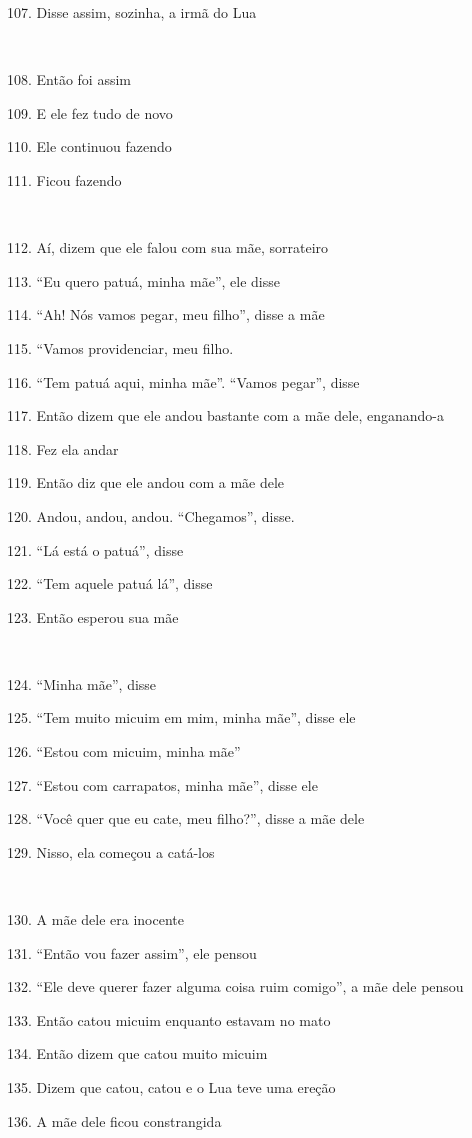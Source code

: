 107. Disse assim, sozinha, a irmã do Lua

~

108. Então foi assim

109. E ele fez tudo de novo

110. Ele continuou fazendo

111. Ficou fazendo

~

112. Aí, dizem que ele falou com sua mãe, sorrateiro

113. ``Eu quero patuá, minha mãe'', ele disse

114. ``Ah! Nós vamos pegar, meu filho'', disse a mãe

115. ``Vamos providenciar, meu filho.

116. ``Tem patuá aqui, minha mãe''. ``Vamos pegar'', disse

117. Então dizem que ele andou bastante com a mãe dele, enganando-a

118. Fez ela andar

119. Então diz que ele andou com a mãe dele

120. Andou, andou, andou. ``Chegamos'', disse.

121. ``Lá está o patuá'', disse

122. ``Tem aquele patuá lá'', disse

123. Então esperou sua mãe

~

124. ``Minha mãe'', disse

125. ``Tem muito micuim em mim, minha mãe'', disse ele

126. ``Estou com micuim, minha mãe''

127. ``Estou com carrapatos, minha mãe'', disse ele

128. ``Você quer que eu cate, meu filho?'', disse a mãe dele

129. Nisso, ela começou a catá-los

~

130. A mãe dele era inocente

131. ``Então vou fazer assim'', ele pensou

132. ``Ele deve querer fazer alguma coisa ruim comigo'', a mãe dele pensou

133. Então catou micuim enquanto estavam no mato

134. Então dizem que catou muito micuim

135. Dizem que catou, catou e o Lua teve uma ereção

136. A mãe dele ficou constrangida

